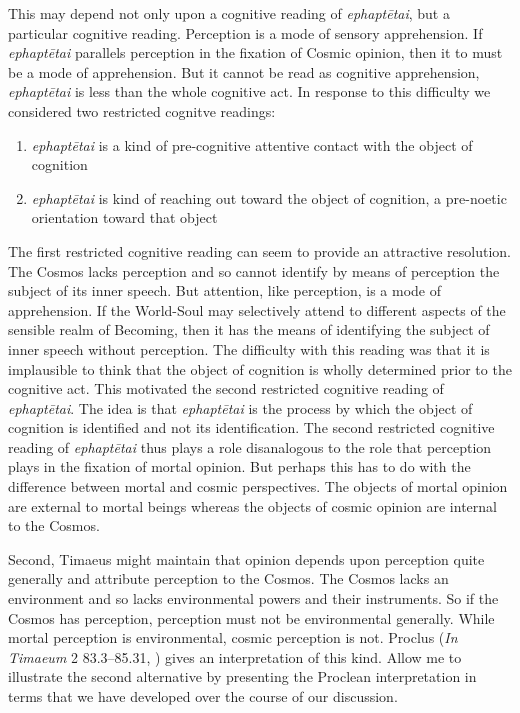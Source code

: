 This may depend not only upon a cognitive reading of \emph{ephaptētai}, but a particular cognitive reading. Perception is a mode of sensory apprehension. If \emph{ephaptētai} parallels perception in the fixation of Cosmic opinion, then it to must be a mode of apprehension. But it cannot be read as cognitive apprehension, \emph{ephaptētai} is less than the whole cognitive act. In response to this difficulty we considered two restricted cognitve readings:
\begin{enumerate}[(1)]
	\item \emph{ephaptētai} is a kind of pre-cognitive attentive contact with the object of cognition
	\item \emph{ephaptētai} is kind of reaching out toward the object of cognition, a pre-noetic orientation toward that object
\end{enumerate}
The first restricted cognitive reading can seem to provide an attractive resolution. The Cosmos lacks perception and so cannot identify by means of perception the subject of its inner speech. But attention, like perception, is a mode of apprehension. If the World-Soul may selectively attend to different aspects of the sensible realm of Becoming, then it has the means of identifying the subject of inner speech without perception. The difficulty with this reading was that it is implausible to think that the object of cognition is wholly determined prior to the cognitive act. This motivated the second restricted cognitive reading of \emph{ephaptētai}. The idea is that \emph{ephaptētai} is the process by which the object of cognition is identified and not its identification. The second restricted cognitive reading of \emph{ephaptētai} thus plays a role disanalogous to the role that perception plays in the fixation of mortal opinion. But perhaps this has to do with the difference between mortal and cosmic perspectives. The objects of mortal opinion are external to mortal beings whereas the objects of cosmic opinion are internal to the Cosmos. 

Second, Timaeus might maintain that opinion depends upon perception quite generally and attribute perception to the Cosmos. The Cosmos lacks an environment and so lacks environmental powers and their instruments. So if the Cosmos has perception, perception must not be environmental generally. While mortal perception is environmental, cosmic perception is not. Proclus (\emph{In Timaeum} 2 83.3–85.31, \citealt{Diehl:1903re}) gives an interpretation of this kind. Allow me to illustrate the second alternative by presenting the Proclean interpretation in terms that we have developed over the course of our discussion.

